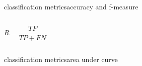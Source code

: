 \begin{frame}{classification metrics}{accuracy and f-measure}
\begin{columns}
{                         \begin{footnotesize}
                        \begin{equation*}
                            R = \frac{TP}{TP + FN}
                        \end{equation*}
                        \end{footnotesize}
                   }
            \end{columns}
        \end{frame}
        
        \begin{frame}{classification metrics}{area under curve}
        \end{frame}

